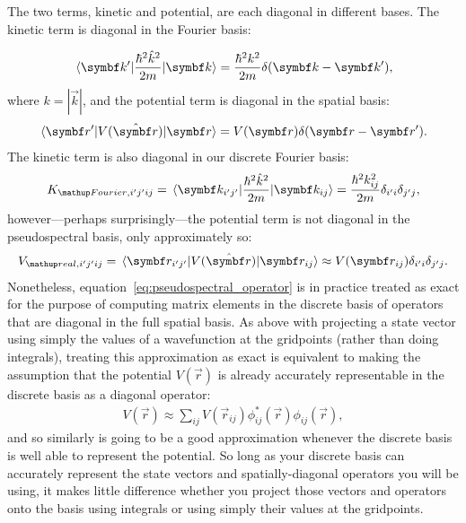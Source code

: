 The two terms, kinetic and potential, are each diagonal in different bases. The kinetic term is diagonal in the Fourier basis:

\begin{align}
\matrixel{\vec k^\prime}{\frac{\hbar^2 \hat k^2}{2m}}{\vec k} = \frac{\hbar^2 k^2}{2m}\delta(\vec k - \vec k^\prime),
\end{align}
where $k = |\vec k|$, and the potential term is diagonal in the spatial basis:
\begin{align}
\matrixel{\vec r^\prime}{V(\hat{\vec r})}{\vec r} = V(\vec r) \delta(\vec r - \vec r^\prime).
\end{align}
The kinetic term is also diagonal in our discrete Fourier basis:
\begin{align}
K_{\up{Fourier}, i^\prime j^\prime i j} = \matrixel{\vec k_{i^\prime j^\prime}}{\frac{\hbar^2 \hat k^2}{2m}}{\vec k_{i j}} = \frac{\hbar^2 k_{i j}^2}{2m}\delta_{i^\prime i}\delta_{j^\prime j},
\end{align}
however---perhaps surprisingly---the potential term is not diagonal in the pseudospectral basis, only approximately so:
\begin{align}\label{eq:pseudospectral_operator}
V_{\up{real}, i^\prime j^\prime i j} = \matrixel{\vec r_{i^\prime j^\prime}}{V(\hat{\vec r})}{\vec r_{i j}} \approx V(\vec r_{i j}) \delta_{i^\prime i}\delta_{j^\prime j}.
\end{align}
Nonetheless, equation~\eqref{eq:pseudospectral_operator} is in practice treated as exact for the purpose of computing matrix elements in the discrete basis of operators that are diagonal in the full spatial basis. As above with projecting a state vector using simply the values of a wavefunction at the gridpoints (rather than doing integrals), treating this approximation as exact is equivalent to making the assumption that the potential $V(\vec r)$ is already accurately representable in the discrete basis as a diagonal operator:
\begin{align}
V(\vec r) \approx \sum_{ij} V(\vec r_{ij}) \phi^\ast_{ij}(\vec r)\phi_{ij}(\vec r),
\end{align}
and so similarly is going to be a good approximation whenever the discrete basis is well able to represent the potential. So long as your discrete basis can accurately represent the state vectors and spatially-diagonal operators you will be using, it makes little difference whether you project those vectors and operators onto the basis using integrals or using simply their values at the gridpoints.

